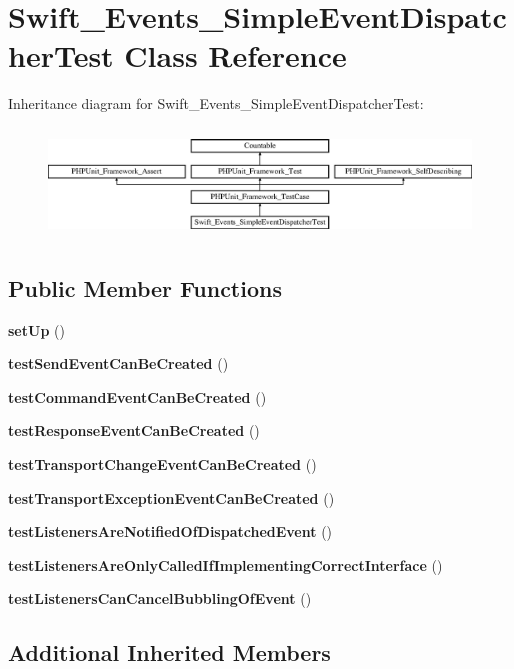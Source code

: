 \section{Swift\+\_\+\+Events\+\_\+\+Simple\+Event\+Dispatcher\+Test Class Reference}
\label{class_swift___events___simple_event_dispatcher_test}
Inheritance diagram for Swift\+\_\+\+Events\+\_\+\+Simple\+Event\+Dispatcher\+Test\+:\begin{figure}[H]
\begin{center}
\leavevmode
\includegraphics[height=2.962963cm]{class_swift___events___simple_event_dispatcher_test}
\end{center}
\end{figure}
\subsection*{Public Member Functions}
\begin{DoxyCompactItemize}
\item 
{\bf set\+Up} ()
\item 
{\bf test\+Send\+Event\+Can\+Be\+Created} ()
\item 
{\bf test\+Command\+Event\+Can\+Be\+Created} ()
\item 
{\bf test\+Response\+Event\+Can\+Be\+Created} ()
\item 
{\bf test\+Transport\+Change\+Event\+Can\+Be\+Created} ()
\item 
{\bf test\+Transport\+Exception\+Event\+Can\+Be\+Created} ()
\item 
{\bf test\+Listeners\+Are\+Notified\+Of\+Dispatched\+Event} ()
\item 
{\bf test\+Listeners\+Are\+Only\+Called\+If\+Implementing\+Correct\+Interface} ()
\item 
{\bf test\+Listeners\+Can\+Cancel\+Bubbling\+Of\+Event} ()
\end{DoxyCompactItemize}
\subsection*{Additional Inherited Members}


